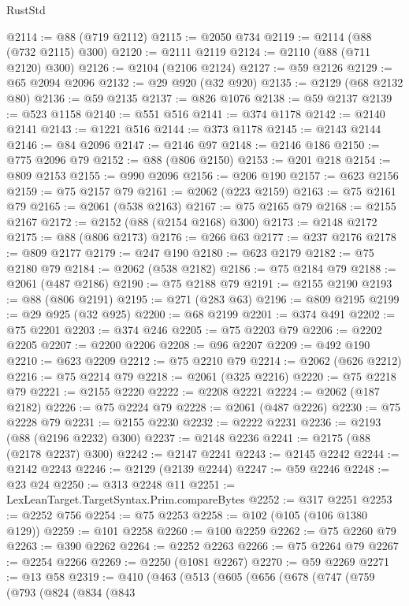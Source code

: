 \begin{lexlean}{RustStd}
\begin{coremodule}
@2114 := @88 (@719 @2112)
@2115 := @2050 @734
@2119 := @2114 (@88 (@732 @2115) @300)
@2120 := @2111 @2119
@2124 := @2110 (@88 (@711 @2120) @300)
@2126 := @2104 (@2106 @2124)
@2127 := @59 @2126
@2129 := @65 @2094 @2096
@2132 := @29 @920 (@32 @920)
@2135 := @2129 (@68 @2132 @80)
@2136 := @59 @2135
@2137 := @826 @1076
@2138 := @59 @2137
@2139 := @523 @1158
@2140 := @551 @516
@2141 := @374 @1178
@2142 := @2140 @2141
@2143 := @1221 @516
@2144 := @373 @1178
@2145 := @2143 @2144
@2146 := @84 @2096
@2147 := @2146 @97
@2148 := @2146 @186
@2150 := @775 @2096 @79
@2152 := @88 (@806 @2150)
@2153 := @201 @218
@2154 := @809 @2153
@2155 := @990 @2096
@2156 := @206 @190
@2157 := @623 @2156
@2159 := @75 @2157 @79
@2161 := @2062 (@223 @2159)
@2163 := @75 @2161 @79
@2165 := @2061 (@538 @2163)
@2167 := @75 @2165 @79
@2168 := @2155 @2167
@2172 := @2152 (@88 (@2154 @2168) @300)
@2173 := @2148 @2172
@2175 := @88 (@806 @2173)
@2176 := @266 @63
@2177 := @237 @2176
@2178 := @809 @2177
@2179 := @247 @190
@2180 := @623 @2179
@2182 := @75 @2180 @79
@2184 := @2062 (@538 @2182)
@2186 := @75 @2184 @79
@2188 := @2061 (@487 @2186)
@2190 := @75 @2188 @79
@2191 := @2155 @2190
@2193 := @88 (@806 @2191)
@2195 := @271 (@283 @63)
@2196 := @809 @2195
@2199 := @29 @925 (@32 @925)
@2200 := @68 @2199
@2201 := @374 @491
@2202 := @75 @2201
@2203 := @374 @246
@2205 := @75 @2203 @79
@2206 := @2202 @2205
@2207 := @2200 @2206
@2208 := @96 @2207
@2209 := @492 @190
@2210 := @623 @2209
@2212 := @75 @2210 @79
@2214 := @2062 (@626 @2212)
@2216 := @75 @2214 @79
@2218 := @2061 (@325 @2216)
@2220 := @75 @2218 @79
@2221 := @2155 @2220
@2222 := @2208 @2221
@2224 := @2062 (@187 @2182)
@2226 := @75 @2224 @79
@2228 := @2061 (@487 @2226)
@2230 := @75 @2228 @79
@2231 := @2155 @2230
@2232 := @2222 @2231
@2236 := @2193 (@88 (@2196 @2232) @300)
@2237 := @2148 @2236
@2241 := @2175 (@88 (@2178 @2237) @300)
@2242 := @2147 @2241
@2243 := @2145 @2242
@2244 := @2142 @2243
@2246 := @2129 (@2139 @2244)
@2247 := @59 @2246
@2248 := @23 @24
@2250 := @313 @2248 @11
@2251 := LexLeanTarget.TargetSyntax.Prim.compareBytes
@2252 := @317 @2251
@2253 := @2252 @756
@2254 := @75 @2253
@2258 := @102 (@105 (@106 @1380 @129))
@2259 := @101 @2258
@2260 := @100 @2259
@2262 := @75 @2260 @79
@2263 := @390 @2262
@2264 := @2252 @2263
@2266 := @75 @2264 @79
@2267 := @2254 @2266
@2269 := @2250 (@1081 @2267)
@2270 := @59 @2269
@2271 := @13 @58
@2319 := @410
    (@463
      (@513
        (@605
          (@656
            (@678
              (@747
                (@759
                  (@793
                    (@824
                      (@834
                        (@843

\end{coremodule}
\end{lexlean}
